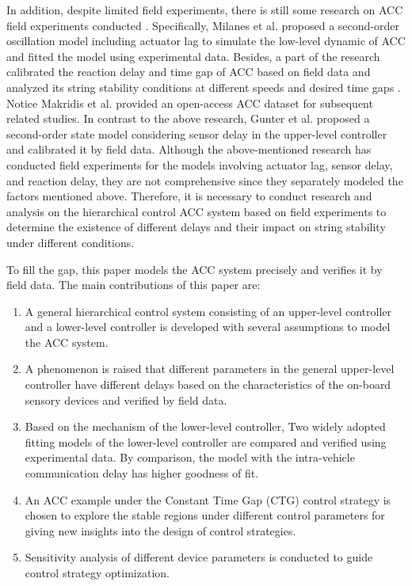\documentclass[journal]{IEEEtran}
\begin{document}
In addition, despite limited field experiments, there is still some research on ACC field experiments conducted \citep {Ciuffo2021,Milanes2014,Li2021,Makridis2018,Makridis2021,Gunter2021}. Specifically, Milanes et al. \citep{Milanes2014} proposed a second-order oscillation model including actuator lag to simulate the low-level dynamic of ACC and fitted the model using experimental data. Besides, a part of the research calibrated the reaction delay and time gap of ACC based on field data and analyzed its string stability conditions at different speeds and desired time gaps \citep{Ciuffo2021,Li2021,Makridis2018}. Notice Makridis et al. \citep{Makridis2021} provided an open-access ACC dataset for subsequent related studies. In contrast to the above research, Gunter et al. \citep{Gunter2021} proposed a second-order state model considering sensor delay in the upper-level controller and calibrated it by field data. Although the above-mentioned research has conducted field experiments for the models involving actuator lag, sensor delay, and reaction delay, they are not comprehensive since they separately modeled the factors mentioned above. Therefore, it is necessary to conduct research and analysis on the hierarchical control ACC system based on field experiments to determine the existence of different delays and their impact on string stability under different conditions. 


To fill the gap, this paper models the ACC system precisely and verifies it by field data. The main contributions of this paper are:

\begin{enumerate}
  \item A general hierarchical control system consisting of an upper-level controller and a lower-level controller is developed with several assumptions to model the ACC system.
  \item A phenomenon is raised that different parameters in the general upper-level controller have different delays based on the characteristics of the on-board sensory devices and verified by field data.
  \item Based on the mechanism of the lower-level controller, Two widely adopted fitting models of the lower-level controller are compared and verified using experimental data. By comparison, the model with the intra-vehicle communication delay has higher goodness of fit.
  \item An ACC example under the Constant Time Gap (CTG) control strategy is chosen to explore the stable regions under different control parameters for giving new insights into the design of control strategies.
  \item Sensitivity analysis of different device parameters is conducted to guide control strategy optimization.
\end{enumerate}
\end{document}
